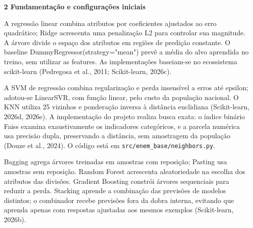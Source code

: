 \documentclass[12pt,a4paper]{article}
\newcommand{\heading}[1]{\par\Needspace{4\baselineskip}\noindent\textbf{#1}\par\vspace{5pt}}
\begin{document}
\clearpage
\heading{2 Fundamentação e configurações iniciais}
A regressão linear combina atributos por coeficientes ajustados ao erro quadrático; Ridge acrescenta uma penalização L2 para controlar sua magnitude. A árvore divide o espaço dos atributos em regiões de predição constante. O baseline DummyRegressor(strategy="mean") prevê a média do alvo aprendida no treino, sem utilizar as features. As implementações baseiam-se no ecossistema scikit-learn (Pedregosa et al., 2011; Scikit-learn, 2026c).


A SVM de regressão combina regularização e perda insensível a erros até epsilon; adotou-se LinearSVR, com função linear, pelo custo da população nacional. O KNN utiliza 25 vizinhos e ponderação inversa à distância euclidiana (Scikit-learn, 2026d, 2026e). A implementação do projeto realiza busca exata: o índice binário Faiss examina exaustivamente os indicadores categóricos, e a parcela numérica usa precisão dupla, preservando a distância, sem amostragem da população (Douze et al., 2024). O código está em \nolinkurl{src/enem_base/neighbors.py}.


Bagging agrega árvores treinadas em amostras com reposição; Pasting usa amostras sem reposição. Random Forest acrescenta aleatoriedade na escolha dos atributos das divisões. Gradient Boosting constrói árvores sequenciais para reduzir a perda. Stacking aprende a combinação das previsões de modelos distintos; o combinador recebe previsões fora da dobra interna, evitando que aprenda apenas com respostas ajustadas aos mesmos exemplos (Scikit-learn, 2026b).
\end{document}
